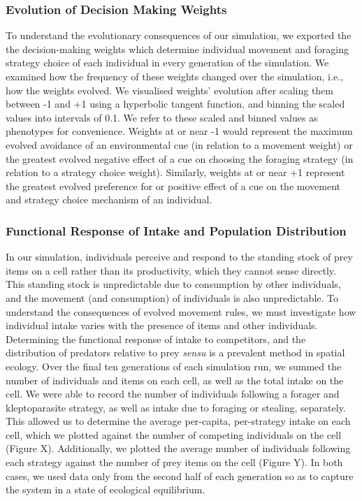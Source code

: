 \documentclass[11pt]{article}
\begin{document}
\subsubsection{Evolution of Decision Making Weights}

To understand the evolutionary consequences of our simulation, we exported the the decision-making weights which determine individual movement and foraging strategy choice of each individual in every generation of the simulation.
We examined how the frequency of these weights changed over the simulation, i.e., how the weights evolved.
We visualised weights' evolution after scaling them between -1 and +1 using a hyperbolic tangent function, and binning the scaled values into intervals of 0.1.
We refer to these scaled and binned values as phenotypes for convenience.
Weights at or near -1 would represent the maximum evolved avoidance of an environmental cue (in relation to a movement weight) or the greatest evolved negative effect of a cue on choosing the foraging strategy (in relation to a strategy choice weight).
Similarly, weights at or near +1 represent the greatest evolved preference for or positive effect of a cue on the movement and strategy choice mechanism of an individual.

\subsubsection{Functional Response of Intake and Population Distribution}

In our simulation, individuals perceive and respond to the standing stock of prey items on a cell rather than its productivity, which they cannot sense directly.
This standing stock is unpredictable due to consumption by other individuals, and the movement (and consumption) of individuals is also unpredictable.
To understand the consequences of evolved movement rules, we must investigate how individual intake varies with the presence of items and other individuals.
Determining the functional response of intake to competitors, and the distribution of predators relative to prey \textit{sensu} \citet{meer1997} is a prevalent method in spatial ecology.
Over the final ten generations of each simulation run, we summed the number of individuals and items on each cell, as well as the total intake on the cell.
We were able to record the number of individuals following a forager and kleptoparasite strategy, as well as intake due to foraging or stealing, separately.
This allowed us to determine the average per-capita, per-strategy intake on each cell, which we plotted against the number of competing individuals on the cell (Figure X).
Additionally, we plotted the average number of individuals following each strategy against the number of prey items on the cell (Figure Y).
In both cases, we used data only from the second half of each generation so as to capture the system in a state of ecological equilibrium.
\end{document}
